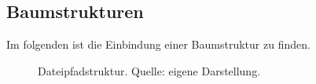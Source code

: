 \subsection{Baumstrukturen}\label{subsec:prozessorientierte-auswahl-der-werkzeuge}

Im folgenden ist die Einbindung einer Baumstruktur zu finden.

\begin{figure}[h!]
  \caption[Dateipfadstruktur.]{Dateipfadstruktur. Quelle: eigene Darstellung.}
  \label{fig:dateipadstruktur}
\end{figure}
